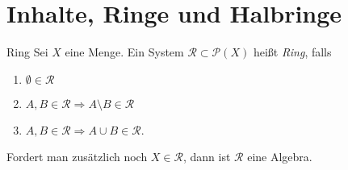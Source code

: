 \section*{Inhalte, Ringe und Halbringe}

\begin{karte}{Ring}
	Sei \(X\) eine Menge. Ein System \(\mathcal{R} \subset \mathcal{P}(X) \) heißt \textit{Ring}, falls 
	\begin{enumerate}
		\item \( \emptyset \in \mathcal{R} \)
		\item \( A,B \in \mathcal{R} \Rightarrow A\setminus B \in \mathcal{R} \)
		\item \( A,B \in \mathcal{R} \Rightarrow A \cup B \in \mathcal{R} \).
	\end{enumerate}
	Fordert man zusätzlich noch \(X \in \mathcal{R}\), dann ist \(\mathcal{R}\) eine Algebra.
\end{karte}
